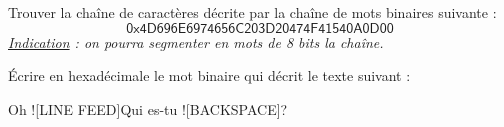 \documentclass[../../main.tex]{subfiles}
\begin{document}
Trouver la chaîne de caractères décrite par la chaîne de mots binaires suivante :
$$\textsf{0x4D696E6974656C203D20474F41540A0D00}$$
\textit{\underline{Indication} : on pourra segmenter en mots de 8 bits la chaîne.}

Écrire en hexadécimale le mot binaire qui décrit le texte suivant :
\begin{center}
Oh !\textsf{[LINE FEED]}Qui es-tu !\textsf{[BACKSPACE]}?
\end{center}
\end{document}

